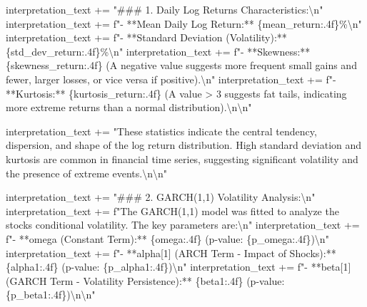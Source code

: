 \documentclass[
  11pt,
]{article}
\newenvironment{Shaded}{}{}
\newcommand{\CharTok}[1]{\textcolor[rgb]{0.25,0.44,0.63}{#1}}
\newcommand{\NormalTok}[1]{#1}
\newcommand{\OperatorTok}[1]{\textcolor[rgb]{0.40,0.40,0.40}{#1}}
\newcommand{\SpecialCharTok}[1]{\textcolor[rgb]{0.25,0.44,0.63}{#1}}
\newcommand{\SpecialStringTok}[1]{\textcolor[rgb]{0.73,0.40,0.53}{#1}}
\newcommand{\StringTok}[1]{\textcolor[rgb]{0.25,0.44,0.63}{#1}}
\begin{document}
\begin{Shaded}
\begin{Highlighting}[]
\NormalTok{interpretation\_text }\OperatorTok{+=} \StringTok{"\#\#\# 1. Daily Log Returns Characteristics:}\CharTok{\textbackslash{}n}\StringTok{"}
\NormalTok{interpretation\_text }\OperatorTok{+=} \SpecialStringTok{f"{-} **Mean Daily Log Return:** }\SpecialCharTok{\{}\NormalTok{mean\_return}\SpecialCharTok{:.4f\}}\SpecialStringTok{\%}\CharTok{\textbackslash{}n}\SpecialStringTok{"}
\NormalTok{interpretation\_text }\OperatorTok{+=} \SpecialStringTok{f"{-} **Standard Deviation (Volatility):** }\SpecialCharTok{\{}\NormalTok{std\_dev\_return}\SpecialCharTok{:.4f\}}\SpecialStringTok{\%}\CharTok{\textbackslash{}n}\SpecialStringTok{"}
\NormalTok{interpretation\_text }\OperatorTok{+=} \SpecialStringTok{f"{-} **Skewness:** }\SpecialCharTok{\{}\NormalTok{skewness\_return}\SpecialCharTok{:.4f\}}\SpecialStringTok{ (A negative value suggests more frequent small gains and fewer, larger losses, or vice versa if positive).}\CharTok{\textbackslash{}n}\SpecialStringTok{"}
\NormalTok{interpretation\_text }\OperatorTok{+=} \SpecialStringTok{f"{-} **Kurtosis:** }\SpecialCharTok{\{}\NormalTok{kurtosis\_return}\SpecialCharTok{:.4f\}}\SpecialStringTok{ (A value \textgreater{} 3 suggests \textquotesingle{}fat tails\textquotesingle{}, indicating more extreme returns than a normal distribution).}\CharTok{\textbackslash{}n\textbackslash{}n}\SpecialStringTok{"}

\NormalTok{interpretation\_text }\OperatorTok{+=} \StringTok{"These statistics indicate the central tendency, dispersion, and shape of the log return distribution. High standard deviation and kurtosis are common in financial time series, suggesting significant volatility and the presence of extreme events.}\CharTok{\textbackslash{}n\textbackslash{}n}\StringTok{"}

\NormalTok{interpretation\_text }\OperatorTok{+=} \StringTok{"\#\#\# 2. GARCH(1,1) Volatility Analysis:}\CharTok{\textbackslash{}n}\StringTok{"}
\NormalTok{interpretation\_text }\OperatorTok{+=} \SpecialStringTok{f"The GARCH(1,1) model was fitted to analyze the stock\textquotesingle{}s conditional volatility. The key parameters are:}\CharTok{\textbackslash{}n}\SpecialStringTok{"}
\NormalTok{interpretation\_text }\OperatorTok{+=} \SpecialStringTok{f"{-} **omega (Constant Term):** }\SpecialCharTok{\{}\NormalTok{omega}\SpecialCharTok{:.4f\}}\SpecialStringTok{ (p{-}value: }\SpecialCharTok{\{}\NormalTok{p\_omega}\SpecialCharTok{:.4f\}}\SpecialStringTok{)}\CharTok{\textbackslash{}n}\SpecialStringTok{"}
\NormalTok{interpretation\_text }\OperatorTok{+=} \SpecialStringTok{f"{-} **alpha[1] (ARCH Term {-} Impact of Shocks):** }\SpecialCharTok{\{}\NormalTok{alpha1}\SpecialCharTok{:.4f\}}\SpecialStringTok{ (p{-}value: }\SpecialCharTok{\{}\NormalTok{p\_alpha1}\SpecialCharTok{:.4f\}}\SpecialStringTok{)}\CharTok{\textbackslash{}n}\SpecialStringTok{"}
\NormalTok{interpretation\_text }\OperatorTok{+=} \SpecialStringTok{f"{-} **beta[1] (GARCH Term {-} Volatility Persistence):** }\SpecialCharTok{\{}\NormalTok{beta1}\SpecialCharTok{:.4f\}}\SpecialStringTok{ (p{-}value: }\SpecialCharTok{\{}\NormalTok{p\_beta1}\SpecialCharTok{:.4f\}}\SpecialStringTok{)}\CharTok{\textbackslash{}n\textbackslash{}n}\SpecialStringTok{"}


\end{Highlighting}
\end{Shaded}
\end{document}
